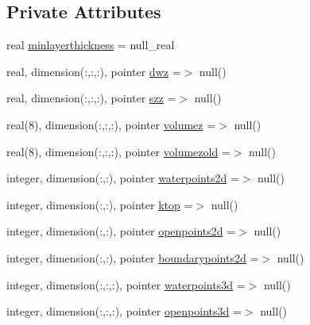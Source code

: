 \subsection*{Private Attributes}
\begin{DoxyCompactItemize}
\item 
real \mbox{\hyperlink{structmoduleinterfacesedimentwater_1_1t__ext__sed_a6b916b15df30cf1b272027d40d14e4c5}{minlayerthickness}} = null\+\_\+real
\item 
real, dimension(\+:,\+:,\+:), pointer \mbox{\hyperlink{structmoduleinterfacesedimentwater_1_1t__ext__sed_aeafb40663bcf40134ab140da040e6fd0}{dwz}} =$>$ null()
\item 
real, dimension(\+:,\+:,\+:), pointer \mbox{\hyperlink{structmoduleinterfacesedimentwater_1_1t__ext__sed_af39222340ce43bb7b8e3daebd839696a}{szz}} =$>$ null()
\item 
real(8), dimension(\+:,\+:,\+:), pointer \mbox{\hyperlink{structmoduleinterfacesedimentwater_1_1t__ext__sed_a6f6826cf52c2d60db0fc0fdc79b2b463}{volumez}} =$>$ null()
\item 
real(8), dimension(\+:,\+:,\+:), pointer \mbox{\hyperlink{structmoduleinterfacesedimentwater_1_1t__ext__sed_a8b6b9f038ee5e283798c9f9b8c3e9aa2}{volumezold}} =$>$ null()
\item 
integer, dimension(\+:,\+:), pointer \mbox{\hyperlink{structmoduleinterfacesedimentwater_1_1t__ext__sed_ada61166cd76ca718d72bda7e73929dc6}{waterpoints2d}} =$>$ null()
\item 
integer, dimension(\+:,\+:), pointer \mbox{\hyperlink{structmoduleinterfacesedimentwater_1_1t__ext__sed_a701917a717c89e57c099d03dcdd24fa6}{ktop}} =$>$ null()
\item 
integer, dimension(\+:,\+:), pointer \mbox{\hyperlink{structmoduleinterfacesedimentwater_1_1t__ext__sed_a44c0f2582a6cf15786056609d87b22e2}{openpoints2d}} =$>$ null()
\item 
integer, dimension(\+:,\+:), pointer \mbox{\hyperlink{structmoduleinterfacesedimentwater_1_1t__ext__sed_a92cc244525fbbb1a078382ded191a75a}{boundarypoints2d}} =$>$ null()
\item 
integer, dimension(\+:,\+:,\+:), pointer \mbox{\hyperlink{structmoduleinterfacesedimentwater_1_1t__ext__sed_a50aba83359f64650c950883977a6bf88}{waterpoints3d}} =$>$ null()
\item 
integer, dimension(\+:,\+:,\+:), pointer \mbox{\hyperlink{structmoduleinterfacesedimentwater_1_1t__ext__sed_add65565db19fc7a0db81c2ca145c166c}{openpoints3d}} =$>$ null()
\item 

\end{DoxyCompactItemize}
